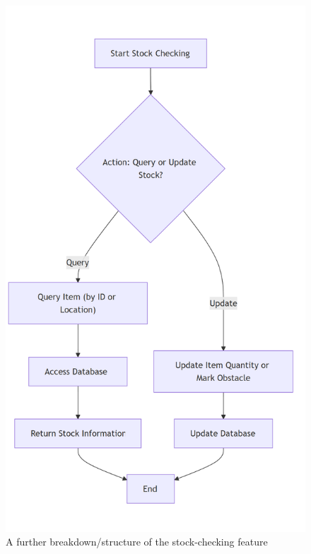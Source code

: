 \begin{figure}[!htbp]
	\centering
	\includegraphics[width=0.9\linewidth]{Images/scoutline.png}
	\caption{A further breakdown/structure of the stock-checking feature}
\end{figure}

